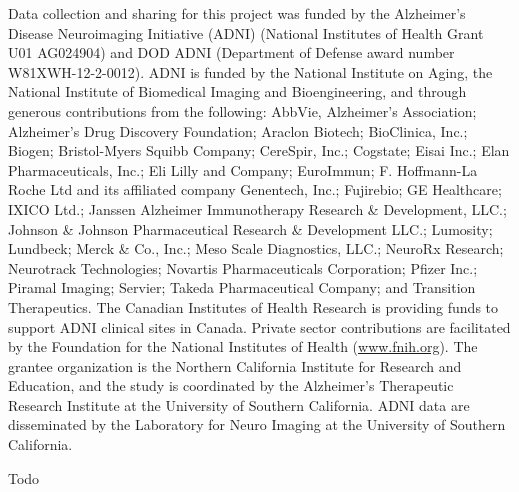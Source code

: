 \documentclass{article}
\begin{document}
Data collection and sharing for this project was funded by the Alzheimer's Disease
Neuroimaging Initiative (ADNI) (National Institutes of Health Grant U01 AG024904) and
DOD ADNI (Department of Defense award number W81XWH-12-2-0012). ADNI is funded
by the National Institute on Aging, the National Institute of Biomedical Imaging and
Bioengineering, and through generous contributions from the following: AbbVie, Alzheimer's
Association; Alzheimer's Drug Discovery Foundation; Araclon Biotech; BioClinica, Inc.;
Biogen; Bristol-Myers Squibb Company; CereSpir, Inc.; Cogstate; Eisai Inc.; Elan
Pharmaceuticals, Inc.; Eli Lilly and Company; EuroImmun; F. Hoffmann-La Roche Ltd and
its affiliated company Genentech, Inc.; Fujirebio; GE Healthcare; IXICO Ltd.; Janssen
Alzheimer Immunotherapy Research \& Development, LLC.; Johnson \& Johnson
Pharmaceutical Research \& Development LLC.; Lumosity; Lundbeck; Merck \& Co., Inc.;
Meso Scale Diagnostics, LLC.; NeuroRx Research; Neurotrack Technologies; Novartis
Pharmaceuticals Corporation; Pfizer Inc.; Piramal Imaging; Servier; Takeda Pharmaceutical
Company; and Transition Therapeutics. The Canadian Institutes of Health Research is
providing funds to support ADNI clinical sites in Canada. Private sector contributions are
facilitated by the Foundation for the National Institutes of Health (\href{http://www.fnih.org}{www.fnih.org}). The grantee
organization is the Northern California Institute for Research and Education, and the study is
coordinated by the Alzheimer's Therapeutic Research Institute at the University of Southern
California. ADNI data are disseminated by the Laboratory for Neuro Imaging at the
University of Southern California.

Todo





\end{document}
